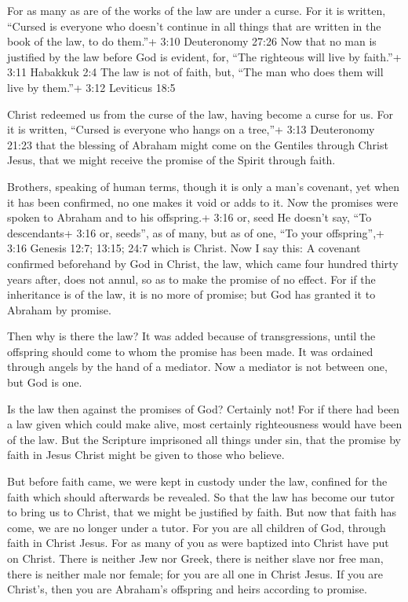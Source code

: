  For as many as are of the works of the law are under a
curse. For it is written, ``Cursed is everyone who doesn't continue in
all things that are written in the book of the law, to do them.''+ 3:10
Deuteronomy 27:26  Now that no man is justified by the law
before God is evident, for, ``The righteous will live by faith.''+ 3:11
Habakkuk 2:4  The law is not of faith, but, ``The man who
does them will live by them.''+ 3:12 Leviticus 18:5

 Christ redeemed us from the curse of the law, having
become a curse for us. For it is written, ``Cursed is everyone who hangs
on a tree,''+ 3:13 Deuteronomy 21:23  that the blessing of
Abraham might come on the Gentiles through Christ Jesus, that we might
receive the promise of the Spirit through faith.

 Brothers, speaking of human terms, though it is only a
man's covenant, yet when it has been confirmed, no one makes it void or
adds to it.  Now the promises were spoken to Abraham and to
his offspring.+ 3:16 or, seed He doesn't say, ``To descendants+ 3:16 or,
seeds'', as of many, but as of one, ``To your offspring'',+ 3:16 Genesis
12:7; 13:15; 24:7 which is Christ.  Now I say this: A
covenant confirmed beforehand by God in Christ, the law, which came four
hundred thirty years after, does not annul, so as to make the promise of
no effect.  For if the inheritance is of the law, it is no
more of promise; but God has granted it to Abraham by promise.

 Then why is there the law? It was added because of
transgressions, until the offspring should come to whom the promise has
been made. It was ordained through angels by the hand of a mediator.
 Now a mediator is not between one, but God is one.

 Is the law then against the promises of God? Certainly
not! For if there had been a law given which could make alive, most
certainly righteousness would have been of the law.  But
the Scripture imprisoned all things under sin, that the promise by faith
in Jesus Christ might be given to those who believe.

 But before faith came, we were kept in custody under the
law, confined for the faith which should afterwards be revealed.
 So that the law has become our tutor to bring us to
Christ, that we might be justified by faith.  But now that
faith has come, we are no longer under a tutor.  For you
are all children of God, through faith in Christ Jesus. 
For as many of you as were baptized into Christ have put on Christ.
 There is neither Jew nor Greek, there is neither slave nor
free man, there is neither male nor female; for you are all one in
Christ Jesus.  If you are Christ's, then you are Abraham's
offspring and heirs according to promise.

